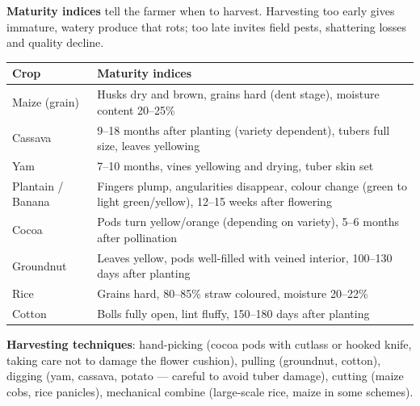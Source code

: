 \documentclass[11pt]{article}
\begin{document}
\textbf{Maturity indices} tell the farmer when to harvest. Harvesting too early gives immature, watery produce that rots; too late invites field pests, shattering losses and quality decline.

\begin{center}
\begin{tabularx}{\linewidth}{|l|X|}
\hline
\rowcolor{popblueL} \textbf{Crop} & \textbf{Maturity indices} \\
\hline
Maize (grain) & Husks dry and brown, grains hard (dent stage), moisture content 20--25\% \\
Cassava & 9--18 months after planting (variety dependent), tubers full size, leaves yellowing \\
Yam & 7--10 months, vines yellowing and drying, tuber skin set \\
Plantain / Banana & Fingers plump, angularities disappear, colour change (green to light green/yellow), 12--15 weeks after flowering \\
Cocoa & Pods turn yellow/orange (depending on variety), 5--6 months after pollination \\
Groundnut & Leaves yellow, pods well-filled with veined interior, 100--130 days after planting \\
Rice & Grains hard, 80--85\% straw coloured, moisture 20--22\% \\
Cotton & Bolls fully open, lint fluffy, 150--180 days after planting \\
\hline
\end{tabularx}
\end{center}

\textbf{Harvesting techniques}: hand-picking (cocoa pods with cutlass or hooked knife, taking care not to damage the flower cushion), pulling (groundnut, cotton), digging (yam, cassava, potato — careful to avoid tuber damage), cutting (maize cobs, rice panicles), mechanical combine (large-scale rice, maize in some schemes).
\end{document}
